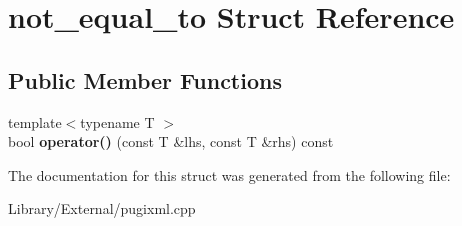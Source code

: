 \hypertarget{structnot__equal__to}{}\section{not\+\_\+equal\+\_\+to Struct Reference}
\label{structnot__equal__to}
\subsection*{Public Member Functions}
\begin{DoxyCompactItemize}
\item 
\hypertarget{structnot__equal__to_acbcb7d0809378458b52e6ed1a07c1d7d}{}{\footnotesize template$<$typename T $>$ }\\bool {\bfseries operator()} (const T \&lhs, const T \&rhs) const \label{structnot__equal__to_acbcb7d0809378458b52e6ed1a07c1d7d}

\end{DoxyCompactItemize}


The documentation for this struct was generated from the following file\+:\begin{DoxyCompactItemize}
\item 
Library/\+External/pugixml.\+cpp\end{DoxyCompactItemize}
